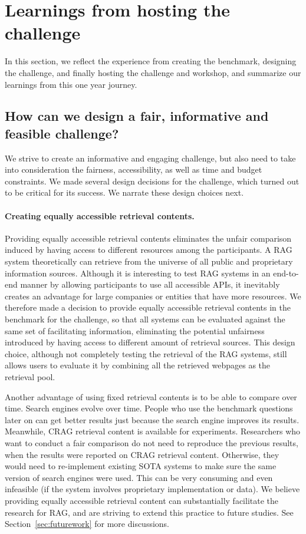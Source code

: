 \section{Learnings from hosting the challenge}\label{sec:hosting}
In this section, we reflect the experience from creating the benchmark, designing the challenge, and finally hosting the challenge and workshop, and summarize our learnings from this one year journey.

\subsection{How can we design a fair, informative and feasible challenge?}
We strive to create an informative and engaging challenge, but also need to take into consideration the fairness, accessibility, as well as time and budget constraints. We made several design decisions for the challenge, which turned out to be critical for its success. We narrate these design choices next.

\paragraph{Creating equally accessible retrieval contents.}
\label{sec:pre-fetch_retrieval_contents}
Providing equally accessible retrieval contents eliminates the unfair comparison induced by having access to different resources among the participants. A RAG system theoretically can retrieve from the universe of all public and proprietary information sources. Although it is interesting to test RAG systems in an end-to-end manner by allowing participants to use all accessible APIs, it inevitably creates an advantage for large companies or entities that have more resources. We therefore made a decision to provide equally accessible retrieval contents in the benchmark for the challenge, so that all systems can be evaluated against the same set of facilitating information, eliminating the potential unfairness introduced by having access to different amount of retrieval sources. This design choice, although not completely testing the retrieval of the RAG systems, still allows users to evaluate it by combining all the retrieved webpages as the retrieval pool. 

Another advantage of using fixed retrieval contents is to be able to compare over time. Search engines evolve over time. People who use the benchmark questions later on can get better results just because the search engine improves its results. Meanwhile, CRAG retrieval content is available for experiments. Researchers who want to conduct a fair comparison do not need to reproduce the previous results, when the results were reported on CRAG retrieval content. Otherwise, they would need to re-implement existing SOTA systems to make sure the same version of search engines were used. This can be very consuming and even infeasible (if the system involves proprietary implementation or data). We believe providing equally accessible retrieval content can substantially facilitate the research for RAG, and are striving to extend this practice to future studies. See Section~\ref{sec:futurework} for more discussions.



